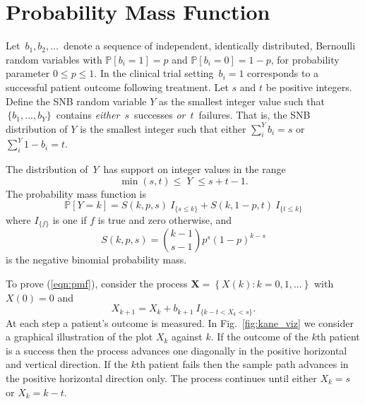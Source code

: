 \documentclass[review]{elsarticle}
\begin{document}
\section{Probability Mass Function}
\label{notation.section}

Let $\,b_1, b_2, \ldots \,$ denote a sequence of independent, identically
distributed, Bernoulli random variables with $\mathbb{P}[b_i=1]=p$ and
$\mathbb{P}[b_i = 0] = 1-p$, for
probability parameter $0\leq p \leq 1$. In the clinical trial setting
$\,b_i = 1$ corresponds to a successful patient outcome following treatment.  
Let $s$ and $t$ be positive integers.  Define the SNB random
variable $Y$ as the smallest
integer value such that $\,\{b_1, \ldots , b_Y\}\,$ contains {\em either}
$\,s\,$ successes {\em or} $\,t\,$ failures. That is, the SNB distribution
of $Y$ is the smallest integer such that either
$\sum_i^Y b_i = s$ or $\sum_i^Y 1-b_i = t$.

The distribution of $\,Y\,$ has support on integer values in the range
\begin{equation*}               
     \min(s,t) \leq \; Y \;\leq s+t-1  \label{range.y.eq}.
\end{equation*}
The probability mass function is
\begin{equation} \label{eqn:pmf}
\mathbb{P} [Y=k] = S(k, p, s) \ I_{\{s \leq k\}} + 
  S(k, 1-p, t) \ I_{\{ t \leq k \}}
\end{equation}
where $I_{\{f\}}$ is one if $f$ is true and zero otherwise, and
\begin{equation} \label{eqn:N}
S(k, p, s) = {k-1 \choose s-1} p^s (1-p)^{k-s} 
\end{equation}
is the negative binomial probability mass.

To prove (\ref{eqn:pmf}), consider the
process $\mathbf{X} = \left\{X(k) : k = 0,1,... \right\}$
with $X(0)=0$ and
\begin{equation*} \label{eqn:proc}
X_{k+1} = X_k + b_{k+1} \ I_{\{ k-t < X_k < s\}}.
\end{equation*}
At each step a patient's outcome is measured. In Fig.~\ref{fig:kane_viz} 
we consider a graphical illustration of the plot $X_k$ against
$k$. If the outcome of the $k$th patient is a success then the process 
advances one diagonally in the
positive horizontal and vertical direction. If the $k$th patient fails
then the sample path advances in the positive horizontal direction only. The
process continues until either $X_k = s$ or $X_k = k-t$.
\end{document}
